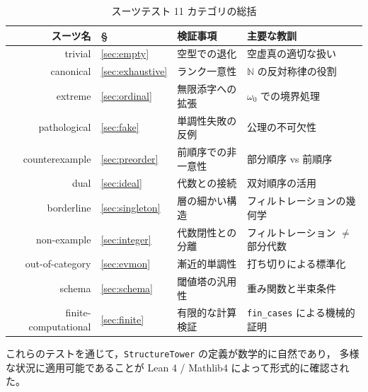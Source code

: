 \documentclass[a4paper,11pt]{ltjsarticle}
\theoremstyle{definition}
\theoremstyle{plain}
\theoremstyle{remark}
\begin{document}
\begin{table}[H]
\centering
\caption{スーツテスト 11 カテゴリの総括}\label{tab:summary}
\begin{tabular}{rlll}
\toprule
スーツ名 & § & 検証事項 & 主要な教訓 \\
\midrule
trivial              & \ref{sec:empty}      & 空型での退化         & 空虚真の適切な扱い \\
canonical            & \ref{sec:exhaustive} & ランク一意性         & $\mathbb{N}$ の反対称律の役割 \\
extreme              & \ref{sec:ordinal}    & 無限添字への拡張     & $\omega_0$ での境界処理 \\
pathological         & \ref{sec:fake}       & 単調性失敗の反例     & 公理の不可欠性 \\
counterexample       & \ref{sec:preorder}   & 前順序での非一意性   & 部分順序 vs 前順序 \\
dual                 & \ref{sec:ideal}      & 代数との接続         & 双対順序の活用 \\
borderline           & \ref{sec:singleton}  & 層の細かい構造       & フィルトレーションの幾何学 \\
non-example          & \ref{sec:integer}    & 代数閉性との分離     & フィルトレーション $\neq$ 部分代数 \\
out-of-category      & \ref{sec:evmon}      & 漸近的単調性         & 打ち切りによる標準化 \\
schema               & \ref{sec:schema}     & 閾値塔の汎用性       & 重み関数と半束条件 \\
finite-computational & \ref{sec:finite}     & 有限的な計算検証     & \texttt{fin\_cases} による機械的証明 \\
\bottomrule
\end{tabular}
\end{table}

これらのテストを通じて，\texttt{StructureTower} の定義が数学的に自然であり，
多様な状況に適用可能であることが Lean 4 / Mathlib4 によって形式的に確認された。

\end{document}

